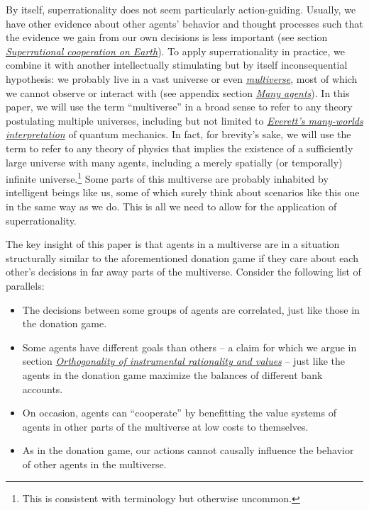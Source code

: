 By itself, superrationality does not seem particularly action-guiding.
Usually, we have other evidence about other agents' behavior and thought
processes such that the evidence we gain from our own decisions is less
important (see section
\protect\hyperlink{superrational-cooperation-on-earth}{\emph{Superrational
cooperation on Earth}}). To apply superrationality in practice, we
combine it with another intellectually stimulating but by itself
inconsequential hypothesis: we probably live in a vast universe or even
\href{https://en.wikipedia.org/wiki/Multiverse}{\emph{multiverse}}, most
of which we cannot observe or interact with (see appendix section
\protect\hyperlink{many-agents}{\emph{Many agents}}). In this paper,
we will use the term ``multiverse'' in a broad sense to refer to any
theory postulating multiple universes, including but not limited to
\href{https://en.wikipedia.org/wiki/Many-worlds_interpretation}{\emph{Everett's
many-worlds interpretation}} of quantum mechanics. In fact, for
brevity's sake, we will use the term to refer to any theory of physics
that implies the existence of a sufficiently large universe with many
agents, including a merely spatially (or temporally) infinite
universe.\footnote{This is consistent with
  \parencite{Tegmark2003-sl} terminology but otherwise
  uncommon.} Some parts of this multiverse are probably inhabited by
intelligent beings like us, some of which surely think about scenarios
like this one in the same way as we do. This is all we need to allow for
the application of superrationality.

The key insight of this paper is that agents in a multiverse are in a
situation structurally similar to the aforementioned donation game if
they care about each other's decisions in far away parts of the
multiverse. Consider the following list of parallels:

\begin{itemize}
\item
  The decisions between some groups of agents are correlated, just like
  those in the donation game.
\item
  Some agents have different goals than others -- a claim for which we
  argue in section
  \protect\hyperlink{orthogonality-of-instrumental-rationality-and-values}{\emph{Orthogonality
  of instrumental rationality and values}} -- just like the agents in
  the donation game maximize the balances of different bank accounts.
\item
  On occasion, agents can ``cooperate'' by benefitting the value systems
  of agents in other parts of the multiverse at low costs to themselves.
\item
  As in the donation game, our actions cannot causally influence the
  behavior of other agents in the multiverse.
\end{itemize}


